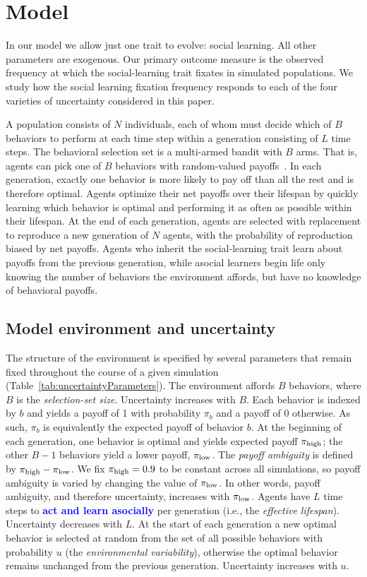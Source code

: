 \documentclass[letterpaper,11.5pt]{scrartcl}
\newcommand{\edit}[1]{{\bfseries \textcolor{blue} {#1}}}
\begin{document}
\section{Model}

In our model we allow just one trait to evolve: social learning. All other parameters are exogenous. Our primary outcome measure is the observed frequency at which the social-learning trait fixates in simulated populations. We study how the social learning fixation frequency responds to each of the four varieties of uncertainty considered in this paper. 

A population consists of $N$ individuals, each of whom must decide which of $B$ behaviors to perform at
each time step within a generation consisting of $L$ time steps. The behavioral selection set is a multi-armed bandit with $B$ arms. That is, agents can pick one of $B$ behaviors with random-valued payoffs~\citep{SuttonBartoBook,McElreath2005,Steyvers2009,Rendell2010,Schulz2019}. In each generation, exactly one behavior is more likely to pay off than all the rest and is therefore optimal. Agents optimize their net payoffs over their lifespan by quickly learning which behavior is optimal and performing it as often as possible within their lifespan. At the end of each generation, agents are selected with replacement to reproduce a new generation of $N$ agents, with the probability of reproduction biased by net payoffs. Agents who inherit the social-learning trait learn about payoffs from the previous generation, while asocial learners begin life only knowing the number of behaviors the environment affords, but have no knowledge of behavioral payoffs.


\subsection{Model environment and uncertainty}

The structure of the environment is specified by several parameters that remain fixed throughout the course of a given simulation (Table~\ref{tab:uncertaintyParameters}).  The environment affords $B$ behaviors, where $B$ is the \emph{selection-set size}. Uncertainty increases with $B$. Each behavior is indexed by $b$ and yields a payoff of 1 with probability $\pi_b$ and a payoff of 0 otherwise. As such, $\pi_b$ is equivalently the expected payoff of behavior $b$. At the beginning of each generation, one behavior is optimal and yields expected payoff $\pi_{\mathrm{high}}$; the other $B-1$ behaviors yield a lower payoff, $\pi_{\mathrm{low}}$. The \emph{payoff ambiguity} is defined by $\pi_{\mathrm{high}} - \pi_{\mathrm{low}}$. We fix $\pi_{\mathrm{high}} = 0.9$ to be constant across all simulations, so payoff ambiguity is varied by changing the value of $\pi_{\mathrm{low}}$. In other words, payoff ambiguity, and therefore uncertainty, increases with $\pi_{\mathrm{low}}$.  Agents have $L$ time steps to \edit{act and learn asocially} per generation (i.e., the \emph{effective lifespan}). Uncertainty decreases with $L$. At the start of each generation a new optimal behavior is selected at random from the set of all possible behaviors with probability $u$ (the \emph{environmental variability}), otherwise the optimal behavior remains unchanged from the previous generation. Uncertainty increases with $u$.
\end{document}

